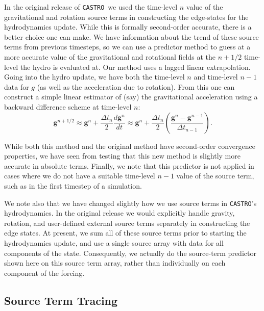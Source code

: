 \documentclass[iop,numberedappendix]{../emulateapj}
\newcommand{\castro}{\texttt{CASTRO}}
\begin{document}
In the original release of \castro\ we used the time-level $n$ value of the 
gravitational and rotation source terms in constructing the edge-states for 
the hydrodynamics update. While this is formally second-order accurate, there
is a better choice one can make. We have information about the trend of these
source terms from previous timesteps, so we can use a predictor method to guess
at a more accurate value of the gravitational and rotational fields at the
$n+1/2$ time-level the hydro is evaluated at. Our method uses a lagged linear
extrapolation. Going into the hydro update, we have both the time-level $n$ and
time-level $n-1$ data for $g$ (as well as the acceleration due to rotation).
From this one can construct a simple linear estimator of (say) the gravitational
acceleration using a backward difference scheme at time-level $n$:
\begin{equation}
  \mathbf{g}^{n+1/2} \approx \mathbf{g}^n + \frac{\Delta t_n}{2} \frac{d\mathbf{g}^n}{dt} \approx \mathbf{g}^n + \frac{\Delta t_n}{2}\left(\frac{\mathbf{g}^n - \mathbf{g}^{n-1}}{\Delta t_{n-1}}\right).
\end{equation}

While both this method and the original method have second-order convergence properties,
we have seen from testing that this new method is slightly more accurate in absolute terms.
Finally, we note that this predictor is not applied in cases where we do not have a suitable
time-level $n-1$ value of the source term, such as in the first timestep of a simulation.

We note also that we have changed slightly how we use source terms in \castro's 
hydrodynamics. In the original release we would explicitly handle gravity, rotation, 
and user-defined external source terms separately in constructing the edge states. 
At present, we sum all of these source terms prior to starting the hydrodynamics 
update, and use a single source array with data for all components of the state. 
Consequently, we actually do the source-term predictor shown here on this source 
term array, rather than individually on each component of the forcing.

\subsection{Source Term Tracing}
\label{sec:gravity_rotation_tracing}
\end{document}
